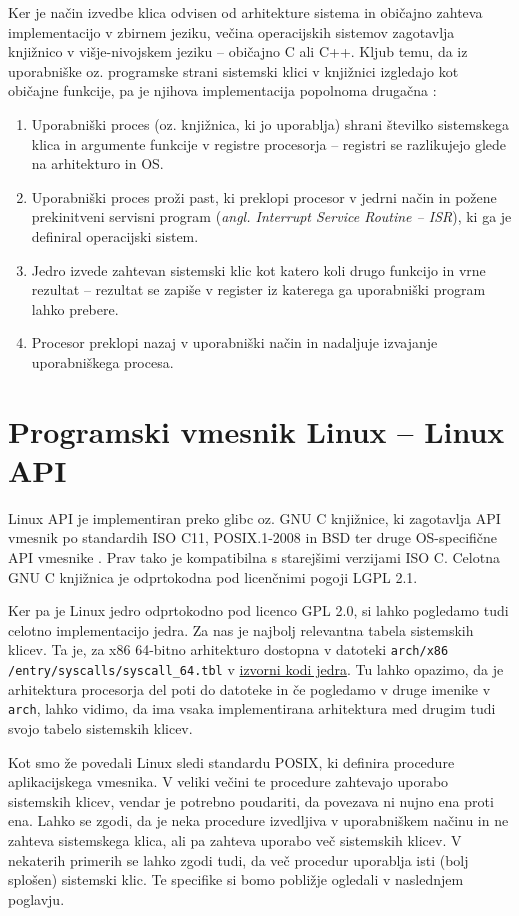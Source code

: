 \documentclass[a4paper,12pt,openright]{book}
\begin{document}
Ker je način izvedbe klica odvisen od arhitekture sistema in običajno zahteva implementacijo v zbirnem jeziku, večina operacijskih sistemov zagotavlja knjižnico v višje-nivojskem jeziku -- običajno C ali C++.
Kljub temu, da iz uporabniške oz. programske strani sistemski klici v knjižnici izgledajo kot običajne funkcije, pa je njihova implementacija popolnoma drugačna \cite{Tanenbaum_Bos_2023}:
\begin{enumerate}
	\item Uporabniški proces (oz. knjižnica, ki jo uporablja) shrani številko sistemskega klica in argumente funkcije v registre procesorja -- registri se razlikujejo glede na arhitekturo in OS.
	\item Uporabniški proces proži past, ki preklopi procesor v jedrni način in požene prekinitveni servisni program (\textit{angl. Interrupt Service Routine -- ISR}), ki ga je definiral operacijski sistem.
	\item Jedro izvede zahtevan sistemski klic kot katero koli drugo funkcijo in vrne rezultat -- rezultat se zapiše v register iz katerega ga uporabniški program lahko prebere.
	\item Procesor preklopi nazaj v uporabniški način in nadaljuje izvajanje uporabniškega procesa.
\end{enumerate}

\section{Programski vmesnik Linux -- Linux API}

Linux API je implementiran preko glibc oz. GNU C knjižnice, ki zagotavlja API vmesnik po standardih ISO C11, POSIX.1-2008 in BSD ter druge OS-specifične API vmesnike \cite{GNU_Manual}.
Prav tako je kompatibilna s starejšimi verzijami ISO C.
Celotna GNU C knjižnica je odprtokodna pod licenčnimi pogoji LGPL 2.1.

Ker pa je Linux jedro odprtokodno pod licenco GPL 2.0, si lahko pogledamo tudi celotno implementacijo jedra.
Za nas je najbolj relevantna tabela sistemskih klicev.
Ta je, za x86 64-bitno arhitekturo dostopna v datoteki \texttt{arch/x86} \texttt{/entry/syscalls/syscall\_64.tbl} v \href{https://github.com/torvalds/linux}{izvorni kodi jedra}.
Tu lahko opazimo, da je arhitektura procesorja del poti do datoteke in če pogledamo v druge imenike v \texttt{arch}, lahko vidimo, da ima vsaka implementirana arhitektura med drugim tudi svojo tabelo sistemskih klicev.

Kot smo že povedali Linux sledi standardu POSIX, ki definira procedure aplikacijskega vmesnika.
V veliki večini te procedure zahtevajo uporabo sistemskih klicev, vendar je potrebno poudariti, da povezava ni nujno ena proti ena.
Lahko se zgodi, da je neka procedure izvedljiva v uporabniškem načinu in ne zahteva sistemskega klica, ali pa zahteva uporabo več sistemskih klicev.
V nekaterih primerih se lahko zgodi tudi, da več procedur uporablja isti (bolj splošen) sistemski klic.
Te specifike si bomo pobližje ogledali v naslednjem poglavju.
\end{document}
